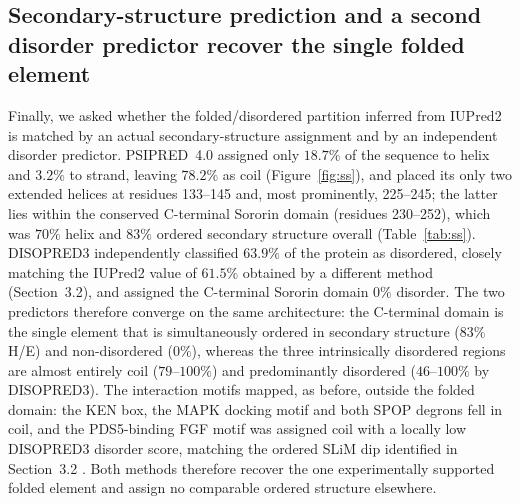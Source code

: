 \documentclass[11pt]{article}
\begin{document}
\FloatBarrier
\subsection{Secondary-structure prediction and a second disorder predictor recover the single folded element}
Finally, we asked whether the folded/disordered partition inferred from IUPred2 is matched by an actual secondary-structure assignment and by an independent disorder predictor. PSIPRED~4.0 assigned only $18.7\%$ of the sequence to helix and $3.2\%$ to strand, leaving $78.2\%$ as coil (Figure~\ref{fig:ss}), and placed its only two extended helices at residues 133--145 and, most prominently, 225--245; the latter lies within the conserved C-terminal Sororin domain (residues 230--252), which was $70\%$ helix and $83\%$ ordered secondary structure overall (Table~\ref{tab:ss}). DISOPRED3 independently classified $63.9\%$ of the protein as disordered, closely matching the IUPred2 value of $61.5\%$ obtained by a different method (Section~3.2), and assigned the C-terminal Sororin domain $0\%$ disorder. The two predictors therefore converge on the same architecture: the C-terminal domain is the single element that is simultaneously ordered in secondary structure ($83\%$ H/E) and non-disordered ($0\%$), whereas the three intrinsically disordered regions are almost entirely coil ($79$--$100\%$) and predominantly disordered ($46$--$100\%$ by DISOPRED3). The interaction motifs mapped, as before, outside the folded domain: the KEN box, the MAPK docking motif and both SPOP degrons fell in coil, and the PDS5-binding FGF motif was assigned coil with a locally low DISOPRED3 disorder score, matching the ordered SLiM dip identified in Section~3.2 \citep{fuxreiter2007}. Both methods therefore recover the one experimentally supported folded element \citep{wu2011} and assign no comparable ordered structure elsewhere.
\end{document}
